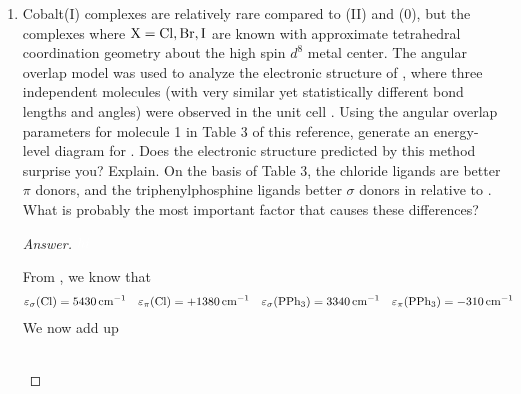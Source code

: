 \documentclass[../psets.tex]{subfiles}
\begin{document}
\begin{enumerate}[label={\Roman*)}]
\begin{enumerate}[label={\textbf{10.\arabic*}}]
\begin{enumerate}[label={\textbf{\alph*.}}]
\begin{proof}[Answer]
\begin{align*}
                \end{align*}
            \end{proof}
        \end{enumerate}
        \newpage
        \setcounter{enumii}{26}
        \item Cobalt(I) complexes are relatively rare compared to (II) and (0), but the complexes  where $\ce{X}=\ce{Cl},\ce{Br},\ce{I}$ are known with approximate tetrahedral coordination geometry about the high spin $d^8$ metal center. The angular overlap model was used to analyze the electronic structure of , where three independent molecules (with very similar yet statistically different bond lengths and angles) were observed in the unit cell \parencite{bib:pset7-1027}. Using the angular overlap parameters for molecule 1 in Table 3 of this reference, generate an energy-level diagram for . Does the electronic structure predicted by this method surprise you? Explain. On the basis of Table 3, the chloride ligands are better $\pi$ donors, and the triphenylphosphine ligands better $\sigma$ donors in  relative to . What is probably the most important factor that causes these differences?
        \begin{proof}[Answer]
            ${\color{white}hi}$
            \begin{center}
            \end{center}
            \vspace{1em}
            From \textcite{bib:pset7-1027}, we know that
            \begin{align*}
                \varepsilon_\sigma(\ce{Cl}) &= \SI{5430}{\per\centi\meter}&
                \varepsilon_\pi(\ce{Cl}) &= +\SI{1380}{\per\centi\meter}&
                \varepsilon_\sigma(\ce{PPh3}) &= \SI{3340}{\per\centi\meter}&
                \varepsilon_\pi(\ce{PPh3}) &= -\SI{310}{\per\centi\meter}
            \end{align*}
            We now add up
            \begin{center}
                \small
                \renewcommand{\arraystretch}{1.4}
                \begin{tabular}{c|cccccc}

\end{tabular}
\end{center}
\end{proof}
\end{enumerate}
\end{enumerate}
\end{document}
